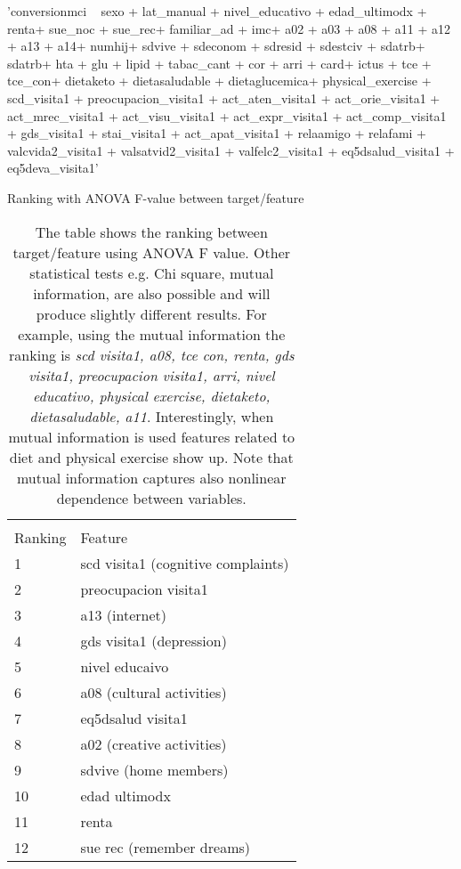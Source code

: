 \documentclass[11pt]{article}
\theoremstyle{definition}
\theoremstyle{remark}
\begin{document}
{\begin{code}[caption=Regression formula, label=formula]
'conversionmci ~ sexo + lat_manual + nivel_educativo  + edad_ultimodx + renta+ sue_noc + sue_rec+ familiar_ad + imc+ a02 + a03 + a08 + a11 + a12 + a13 + a14+ numhij+ sdvive + sdeconom + sdresid + sdestciv + sdatrb+ sdatrb+ hta + glu + lipid + tabac_cant + cor + arri + card+ ictus + tce + tce_con+ dietaketo + dietasaludable + dietaglucemica+ physical_exercise + scd_visita1 + preocupacion_visita1 + act_aten_visita1 + act_orie_visita1 + act_mrec_visita1 + act_visu_visita1 + act_expr_visita1 + act_comp_visita1 + gds_visita1 + stai_visita1 + act_apat_visita1 + relaamigo + relafami + valcvida2_visita1 + valsatvid2_visita1 + valfelc2_visita1 + eq5dsalud_visita1 + eq5deva_visita1'
\end{code}

\begin{table}[H]
\caption{Ranking with ANOVA F-value between target/feature} \label{tab:ranking} 
\begin{center} 
\begin{tabular}{ll}
\hline
\multicolumn{1}{c}{} \\
Ranking & Feature     \\
\hline
1 & scd visita1 (cognitive complaints)         \\
2 & preocupacion visita1 \\
3 & a13 (internet) \\
4 & gds visita1 (depression)\\
5 & nivel educaivo \\
6 & a08 (cultural activities)\\
7 & eq5dsalud visita1 \\
8 & a02 (creative activities) \\
9 & sdvive (home members)\\
10 & edad ultimodx \\
11 & renta \\
12 & sue rec (remember dreams) \\
\hline
\end{tabular}
\caption{The table shows the ranking between target/feature using ANOVA F value. Other statistical tests e.g. Chi square, mutual information, are also possible and will produce slightly different results. For example, using the mutual information the ranking is \emph{scd visita1, a08, tce con, renta, gds visita1, preocupacion visita1, arri, nivel educativo, physical exercise, dietaketo, dietasaludable, a11}. Interestingly, when mutual information is used features related to diet and physical exercise show up. Note that mutual information captures also nonlinear dependence between variables.}
\end{center}
\end{table}

}
\end{document}

